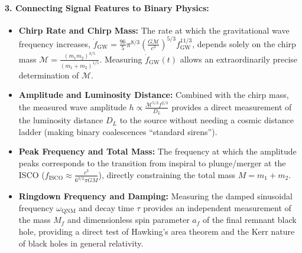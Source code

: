 \documentclass[12pt]{article}
\begin{document}
\paragraph{3. Connecting Signal Features to Binary Physics:}
\begin{itemize}
    \item \textbf{Chirp Rate and Chirp Mass:} The rate at which the gravitational wave frequency increases, $\dot f_{\text{GW}} = \frac{96}{5} \pi^{8/3} \left( \frac{G \mathcal{M}}{c^3} \right)^{5/3} f_{\text{GW}}^{11/3}$, depends solely on the chirp mass $\mathcal{M} = \frac{(m_1 m_2)^{3/5}}{(m_1+m_2)^{1/5}}$. Measuring $\dot f_{\text{GW}}(t)$ allows an extraordinarily precise determination of $\mathcal{M}$.
    \item \textbf{Amplitude and Luminosity Distance:} Combined with the chirp mass, the measured wave amplitude $h \propto \frac{\mathcal{M}^{5/3} f^{2/3}}{D_L}$ provides a direct measurement of the luminosity distance $D_L$ to the source without needing a cosmic distance ladder (making binary coalescences ``standard sirens'').
    \item \textbf{Peak Frequency and Total Mass:} The frequency at which the amplitude peaks corresponds to the transition from inspiral to plunge/merger at the ISCO ($f_{\text{ISCO}} \approx \frac{c^3}{6^{3/2} \pi G M}$), directly constraining the total mass $M = m_1 + m_2$.
    \item \textbf{Ringdown Frequency and Damping:} Measuring the damped sinusoidal frequency $\omega_{\text{QNM}}$ and decay time $\tau$ provides an independent measurement of the mass $M_f$ and dimensionless spin parameter $a_f$ of the final remnant black hole, providing a direct test of Hawking's area theorem and the Kerr nature of black holes in general relativity.
\end{itemize}
\end{document}
